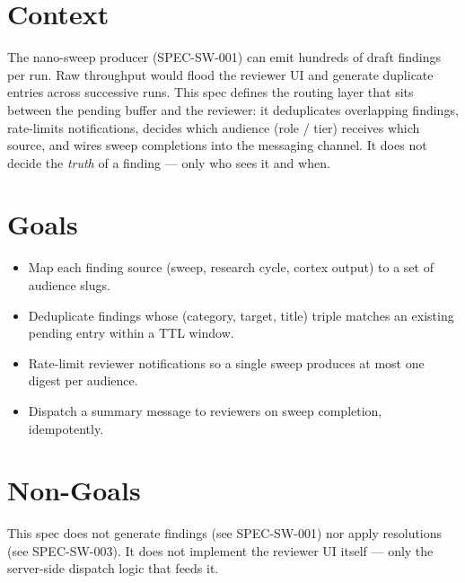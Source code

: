 



\makespecheader

\section{Context}
The nano-sweep producer (SPEC-SW-001) can emit hundreds of draft findings per run. Raw throughput would flood the reviewer UI and generate duplicate entries across successive runs. This spec defines the routing layer that sits between the pending buffer and the reviewer: it deduplicates overlapping findings, rate-limits notifications, decides which audience (role / tier) receives which source, and wires sweep completions into the messaging channel. It does not decide the \emph{truth} of a finding --- only who sees it and when.

\section{Goals}
\begin{itemize}[leftmargin=1.2em]
  \item Map each finding source (sweep, research cycle, cortex output) to a set of audience slugs.
  \item Deduplicate findings whose (category, target, title) triple matches an existing pending entry within a TTL window.
  \item Rate-limit reviewer notifications so a single sweep produces at most one digest per audience.
  \item Dispatch a summary message to reviewers on sweep completion, idempotently.
\end{itemize}

\section{Non-Goals}
\begin{nongoal}
This spec does not generate findings (see SPEC-SW-001) nor apply resolutions (see SPEC-SW-003). It does not implement the reviewer UI itself --- only the server-side dispatch logic that feeds it.
\end{nongoal}

